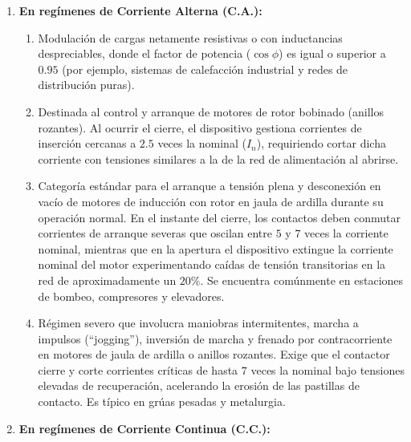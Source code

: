 \begin{enumerate}[label=\Alph*., leftmargin=0.6cm, font=\bfseries\color{black!60!black}, itemsep=0.5cm]

    \item\textbf{ En regímenes de Corriente Alterna (C.A.):}
    \begin{enumerate}[label=\textbf{\color{black}AC-\arabic*}:, leftmargin=1.5cm, itemsep=0.3cm, align=left]
        
        \item Modulación de cargas netamente resistivas o con inductancias despreciables, donde el factor de potencia ($\cos \phi$) es igual o superior a $0.95$ (por ejemplo, sistemas de calefacción industrial y redes de distribución puras).
        
        \item Destinada al control y arranque de motores de rotor bobinado (anillos rozantes). Al ocurrir el cierre, el dispositivo gestiona corrientes de inserción cercanas a $2.5$ veces la nominal ($I_n$), requiriendo cortar dicha corriente con tensiones similares a la de la red de alimentación al abrirse.
        
        \item Categoría estándar para el arranque a tensión plena y desconexión en vacío de motores de inducción con rotor en jaula de ardilla durante su operación normal. En el instante del cierre, los contactos deben conmutar corrientes de arranque severas que oscilan entre $5$ y $7$ veces la corriente nominal, mientras que en la apertura el dispositivo extingue la corriente nominal del motor experimentando caídas de tensión transitorias en la red de aproximadamente un $20\%$. Se encuentra comúnmente en estaciones de bombeo, compresores y elevadores.
        
        \item Régimen severo que involucra maniobras intermitentes, marcha a impulsos (``jogging''), inversión de marcha y frenado por contracorriente en motores de jaula de ardilla o anillos rozantes. Exige que el contactor cierre y corte corrientes críticas de hasta $7$ veces la nominal bajo tensiones elevadas de recuperación, acelerando la erosión de las pastillas de contacto. Es típico en grúas pesadas y metalurgia.
        
    \end{enumerate}

    \item \textbf{En regímenes de Corriente Continua (C.C.):}
    \begin{enumerate}[label=\textbf{\color{black}DC-\arabic*}:, leftmargin=1.5cm, itemsep=0.3cm, align=left]
        

\end{enumerate}
\end{enumerate}
